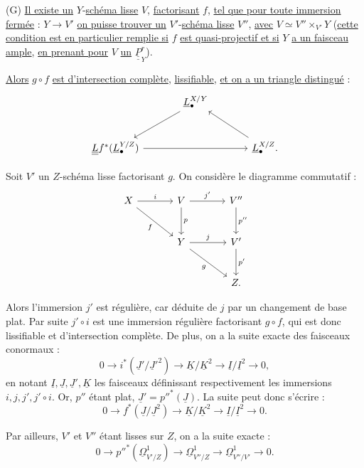 
(G) \uline{Il
existe un} $Y$-\uline{schéma lisse} $V$, \uline{factorisant} $f$, \uline{tel que pour toute immersion fermée} : $Y\to V'$ \uline{on puisse trouver un} $V'$-\uline{schéma lisse} $V''$, \uline{avec} $V\simeq V''\times_{V'}Y$ (\uline{cette condition est en particulier remplie si} $f$ \uline{est quasi-projectif et si} $Y$ \uline{a un faisceau ample}, \uline{en prenant pour} $V$ \uline{un} $\underline{\underline{P}}^r_Y$).

\uline{Alors} $g\circ f$ \uline{est d'intersection complète}, \uline{lissifiable}, \uline{et on a un triangle distingué} :
\[
\begin{tikzcd}[column sep=large,row sep=large]
& \underline{L}^{X/Y}_\bullet \arrow[dl] \\
\underline{\underline{L}}f^*(\underline{L}^{Y/Z}_\bullet) \arrow[rr] && \underline{L}^{X/Z}_\bullet . \arrow[ul]
\end{tikzcd}
\]

Soit $V'$ un $Z$-schéma lisse factorisant $g$. On considère le diagramme commutatif :
\[
\begin{tikzcd}[column sep=large,row sep=large]
X \arrow[r,"i"] \arrow[dr,"f"'] & V \arrow[r,"j'"] \arrow[d,"p"] & V'' \arrow[d,"p''"]\\
& Y \arrow[r,"j"] \arrow[dr,"g"'] & V' \arrow[d,"p'"]\\
& & Z .
\end{tikzcd}
\]

Alors l'immersion $j'$ est régulière, car déduite de $j$ par un changement de base plat. Par suite $j'\circ i$ est une immersion régulière factorisant $g\circ f$, qui est donc lissifiable et d'intersection complète. De plus, on a la suite exacte des faisceaux conormaux :
\[
0\longrightarrow i^*(\underline{J}'/\underline{J}'^2)\longrightarrow \underline{K}/\underline{K}^2\longrightarrow \underline{I}/\underline{I}^2\longrightarrow0,
\]
en notant $\underline{I},\underline{J},\underline{J}',\underline{K}$ les faisceaux définissant respectivement les immersions $i,j,j',j'\circ i$. Or, $p''$ étant plat, $\underline{J}'=p''^*(\underline{J})$. La suite peut donc s'écrire :
\begin{equation}\tag{2.6.1}
0\longrightarrow f^*(\underline{J}/\underline{J}^2)\longrightarrow \underline{K}/\underline{K}^2\longrightarrow \underline{I}/\underline{I}^2\longrightarrow0.
\end{equation}

Par ailleurs, $V'$ et $V''$ étant lisses sur $Z$, on a la suite exacte :
\[
0\longrightarrow p''^*(\underline{\Omega}^1_{V'/Z})\longrightarrow\underline{\Omega}^1_{V''/Z}\longrightarrow\underline{\Omega}^1_{V''/V'}\longrightarrow0.
\]
